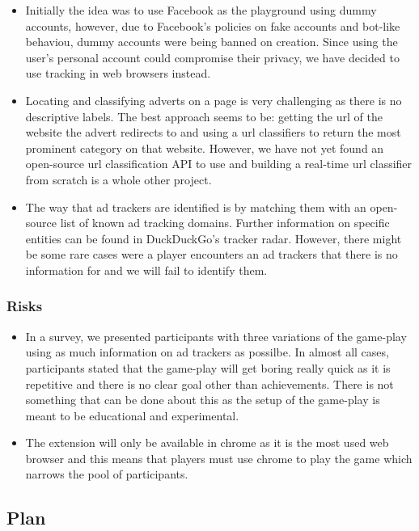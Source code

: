 \documentclass[11pt]{article}
\begin{document}
\begin{itemize}
\item  Initially the idea was to use Facebook as the playground using dummy accounts, however, due to Facebook's policies on fake accounts and bot-like behaviou, dummy accounts were being banned on creation. Since using the user's personal account could compromise their privacy, we have decided to use tracking in web browsers instead.
\item  Locating and classifying adverts on a page is very challenging as there is no descriptive labels. The best approach seems to be: getting the url of the website the advert redirects to and using a url classifiers to return the most prominent category on that website. However, we have not yet found an open-source url classification API to use and building a real-time url classifier from scratch is a whole other project.
\item  The way that ad trackers are identified is by matching them with an open-source list of known ad tracking domains. Further information on specific entities can be found in DuckDuckGo's tracker radar. However, there might be some rare cases were a player encounters an ad trackers that there is no information for and we will fail to identify them. 
\end{itemize}

\subsubsection{Risks}\label{risks}

\begin{itemize}
\item  In a survey, we presented participants with three variations of the game-play using as much information on ad trackers as possilbe. In almost all cases, participants stated that the game-play will get boring really quick as it is repetitive and there is no clear goal other than achievements. There is not something that can be done about this as the setup of the game-play is meant to be educational and experimental.
\item  The extension will only be available in chrome as it is the most used web browser and this means that players must use chrome to play the game which narrows the pool of participants.

\end{itemize}

\subsection{Plan}\label{plan}
\end{document}
